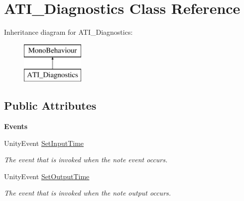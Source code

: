 \hypertarget{class_a_t_i___diagnostics}{}\section{A\+T\+I\+\_\+\+Diagnostics Class Reference}
\label{class_a_t_i___diagnostics}
Inheritance diagram for A\+T\+I\+\_\+\+Diagnostics\+:\begin{figure}[H]
\begin{center}
\leavevmode
\includegraphics[height=2.000000cm]{class_a_t_i___diagnostics}
\end{center}
\end{figure}
\subsection*{Public Attributes}
\begin{Indent}\textbf{ Events}\par
\begin{DoxyCompactItemize}
\item 
\mbox{\label{class_a_t_i___diagnostics_a133561901c2aef535b2f3c098e55b959}} 
Unity\+Event \hyperlink{class_a_t_i___diagnostics_a133561901c2aef535b2f3c098e55b959}{Set\+Input\+Time}
\begin{DoxyCompactList}\small\item\em The event that is invoked when the note event occurs. \end{DoxyCompactList}\item 
\mbox{\label{class_a_t_i___diagnostics_a6360e6098323b921b4a1b306914d06ef}} 
Unity\+Event \hyperlink{class_a_t_i___diagnostics_a6360e6098323b921b4a1b306914d06ef}{Set\+Output\+Time}
\begin{DoxyCompactList}\small\item\em The event that is invoked when the note output occurs. \end{DoxyCompactList}\end{DoxyCompactItemize}
\end{Indent}
